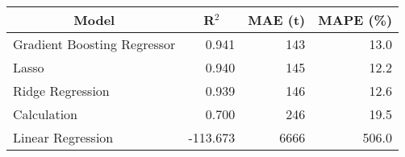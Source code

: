 
\begin{tabular}[t]{lrrr}
\toprule
\multicolumn{1}{c}{Model} & \multicolumn{1}{c}{R$^2$} & \multicolumn{1}{c}{MAE (t)} & \multicolumn{1}{c}{MAPE (\%)}\\
\midrule
Gradient Boosting Regressor & 0.941 & 143 & 13.0\\
Lasso & 0.940 & 145 & 12.2\\
Ridge Regression & 0.939 & 146 & 12.6\\
Calculation & 0.700 & 246 & 19.5\\
Linear Regression & -113.673 & 6666 & 506.0\\
\bottomrule
\end{tabular}
